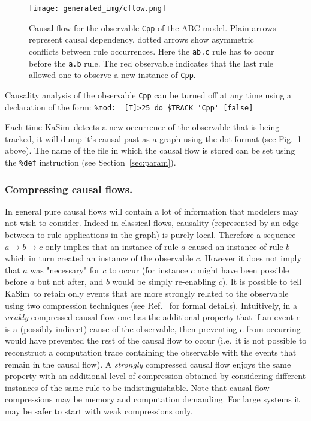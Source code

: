 \documentclass[11pt]{book}
\def\KaSim{\textsf{KaSim}}
\def\ttt#1{\texttt{#1}}
\def\rar{\rightarrow}
\def\ie{i.e.~}
\begin{document}
\begin{figure}[htbp]
\begin{center}
\texttt{[image: generated\_img/cflow.png]}
\caption{Causal flow for the observable \ttt{{\textquotesingle}Cpp{\textquotesingle}} of the ABC model. Plain arrows represent causal dependency, dotted arrows show asymmetric conflicts between rule occurrences. Here the \ttt{{\textquotesingle}ab.c{\textquotesingle}} rule has to occur before the \ttt{{\textquotesingle}a.b{\textquotesingle}} rule. The red observable indicates that the last rule allowed one to observe a new instance of \ttt{{\textquotesingle}Cpp{\textquotesingle}}.}
\label{fig:cflow}
\end{center}
\end{figure}

Causality analysis of the observable \ttt{Cpp} can be turned off at any time using a declaration of the form:
\lstinline[language=kappa]!%mod:  [T]>25 do $TRACK 'Cpp' [false]!

Each time \KaSim~detects a new occurrence of the observable that is being tracked, it will dump it's causal past as a graph using the dot format (see Fig.~\ref{fig:cflow} above). The name of the file in which the causal flow is stored can be set using the \texttt{\%def} instruction (see Section~\ref{sec:param}).

\subsubsection*{Compressing causal flows.}

In general pure causal flows will contain a lot of information that modelers may not wish to consider. Indeed in classical flows, causality (represented by an edge between to rule applications in the graph) is purely local. Therefore a sequence $a\rar b \rar c$ only implies that an instance of rule $a$ caused an instance of rule $b$ which in turn created an instance of the observable $c$. However it does not imply that $a$ was "necessary" for $c$ to occur (for instance $c$ might have been possible before $a$ but not after, and $b$ would be simply re-enabling $c$). It is possible to tell \KaSim~to retain only events that are more strongly related to the observable using two compression techniques (see Ref.~\cite{Dan_etal12} for formal details). Intuitively, in a \emph{weakly} compressed causal flow one has the additional property that if an event $e$ is a (possibly indirect) cause of the observable, then preventing $e$ from occurring would have prevented the rest of the causal flow to occur ({\ie}it is not possible to reconstruct a computation trace containing the observable with the events that remain in the causal flow). A \emph{strongly} compressed causal flow enjoys the same property with an additional level of compression obtained by considering different instances of the same rule to be indistinguishable. Note that causal flow compressions may be memory and computation demanding. For large systems it may be safer to start with weak compressions only.
\end{document}
